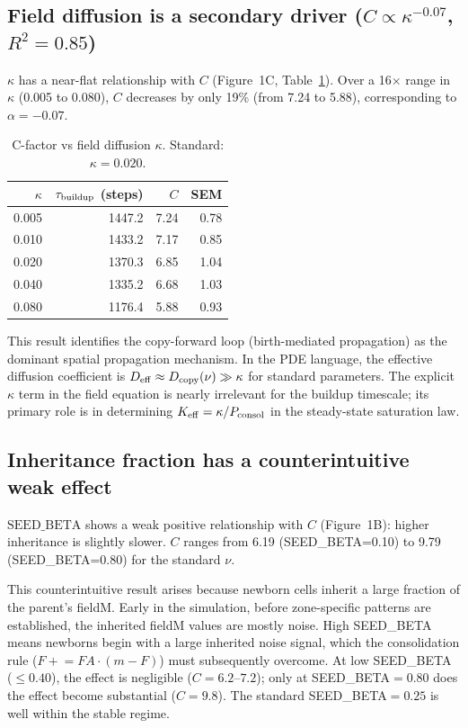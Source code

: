 \documentclass[11pt]{article}
\begin{document}
\subsection{Field diffusion is a secondary driver ($C \propto \kappa^{-0.07}$, $R^2=0.85$)}

$\kappa$ has a near-flat relationship with $C$ (Figure~1C, Table~\ref{tab:kappa}).
Over a 16$\times$ range in $\kappa$ (0.005 to 0.080), $C$ decreases by only 19\%
(from 7.24 to 5.88), corresponding to $\alpha = -0.07$.

\begin{table}[ht]
\centering
\caption{C-factor vs field diffusion $\kappa$. Standard: $\kappa=0.020$.}
\label{tab:kappa}
\begin{tabular}{rrrr}
\toprule
$\kappa$ & $\tau_{\rm buildup}$ (steps) & $C$ & SEM \\
\midrule
0.005 & 1447.2 & 7.24 & 0.78 \\
0.010 & 1433.2 & 7.17 & 0.85 \\
0.020 & 1370.3 & 6.85 & 1.04 \\
0.040 & 1335.2 & 6.68 & 1.03 \\
0.080 & 1176.4 & 5.88 & 0.93 \\
\bottomrule
\end{tabular}
\end{table}

This result identifies the copy-forward loop (birth-mediated propagation) as the
dominant spatial propagation mechanism.
In the PDE language, the effective diffusion coefficient is
$D_{\rm eff} \approx D_{\rm copy}(\nu) \gg \kappa$ for standard parameters.
The explicit $\kappa$ term in the field equation is nearly irrelevant for the buildup
timescale; its primary role is in determining $K_{\rm eff} = \kappa/P_{\rm consol}$
in the steady-state saturation law.

\subsection{Inheritance fraction has a counterintuitive weak effect}

$\mathrm{SEED\_BETA}$ shows a weak positive relationship with $C$ (Figure~1B):
higher inheritance is slightly slower.
$C$ ranges from 6.19 (SEED\_BETA=0.10) to 9.79 (SEED\_BETA=0.80) for the
standard $\nu$.

This counterintuitive result arises because newborn cells inherit a large
fraction of the parent's fieldM.
Early in the simulation, before zone-specific patterns are established, the
inherited fieldM values are mostly noise.
High SEED\_BETA means newborns begin with a large inherited noise signal,
which the consolidation rule ($F \mathrel{+}= FA \cdot (m - F)$) must subsequently
overcome.
At low SEED\_BETA ($\leq 0.40$), the effect is negligible ($C = 6.2$--$7.2$);
only at SEED\_BETA$=0.80$ does the effect become substantial ($C = 9.8$).
The standard SEED\_BETA$=0.25$ is well within the stable regime.
\end{document}
